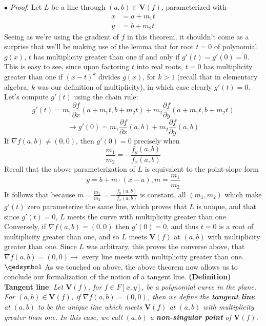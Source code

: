 \documentclass{article}
\begin{document}
\newline
\indent $ \bullet $ \textit{Proof}: Let $ L $ be a line through $ (a, b) \in \mathbf{V}(f) $, parameterized with
$$ \begin{aligned}
	x &= a + m_1 t \\
	y &= b + m_2 t
\end{aligned} $$
\indent Seeing as we're using the gradient of $ f $ in this theorem, it shouldn't come as a surprise that we'll be making use of the lemma that for root $ t = 0 $ of polynomial $ g(x) $, $ t $ has multiplicity greater than one if and only if $ g'(t) = g'(0) = 0 $. This is easy to see, since upon factoring $ t $ into real roots, $ t = 0 $ has multiplicity greater than one if $ (x - t)^k $ divides $ g(x) $, for $ k > 1 $ (recall that in elementary algebra, $ k $ was our definition of multiplicity), in which case clearly $ g'(t) = 0 $.
\newline
Let's compute $ g'(t) $ using the chain rule:
$$ g'(t) = m_1 \frac{\partial f}{\partial x}(a + m_1 t, b + m_2 t) + m_2 \frac{\partial f}{\partial y}(a + m_1 t, b + m_2 t) $$
$$ \rightarrow g'(0) = m_1 \frac{\partial f}{\partial x}(a, b) + m_2 \frac{\partial f}{\partial y}(a, b) $$
If $ \nabla f(a, b) \neq (0, 0) $, then $ g'(0) = 0 $ precisely when
$$ \frac{m_1}{m_2} = - \frac{f_y(a, b)}{f_x(a, b)} $$
Recall that the above parameterization of $ L $ is equivalent to the point-slope form
$$ y = b + m \cdot (x - a), m = \frac{m_1}{m_2} $$
It follows that because $ m = \frac{m_1}{m_2} = - \frac{f_y(a, b)}{f_x(a, b)} $ is constant, all $ (m_1, m_2) $ which make $ g'(t) $ zero parameterize the same line, which proves that $ L $ is unique, and that since $ g'(t) = 0 $, $ L $ meets the curve with multiplicity greater than one.
\newline
Conversely, if $ \nabla f(a, b) = (0, 0) $ then $ g'(0) = 0 $, and thus $ t = 0 $ is a root of multiplicity greater than one, and so $ L $ meets $ \mathbf{V}(f) $ at $ (a, b) $ with multiplicity greater than one. Since $ L $ was arbitrary, this proves the converse above, that $ \nabla f(a, b) = (0, 0) \rightarrow $ every line meets with multiplicity greater than one. $ \qedsymbol $
\newline \newline
As we touched on above, the above theorem now allows us to conclude our formalization of the notion of a tangent line.
\newline \newline
\textbf{(Definition) Tangent line}: \textit{Let $ \mathbf{V}(f) $, for $ f \in F[x, y] $, be a polynomial curve in the plane. For $ (a, b) \in \mathbf{V}(f) $, if $ \nabla f(a, b) = (0, 0) $, then we define the \textbf{tangent line} at $ (a, b) $ to be the unique line which meets $ \mathbf{V}(f) $ at $ (a, b) $ with multiplicity greater than one. In this case, we call $ (a, b) $ a \textbf{non-singular point} of $ \mathbf{V}(f) $.}
\end{document}
